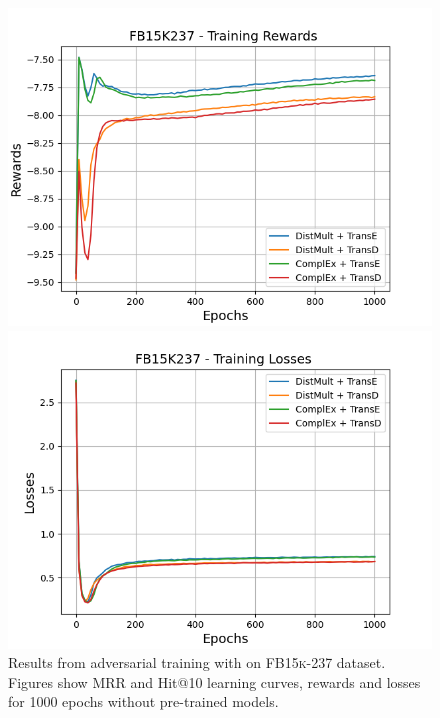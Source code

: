 \begin{figure}[H]
    \begin{minipage}{.45\textwidth}
      \centering
      \includegraphics[width=0.9\linewidth]{figures/results/gan_train/not_pretrained/random/fb15k237/epochs1000/random_fb15k237_rew.png}
    \end{minipage}%
     \begin{minipage}{.45\textwidth}
      \centering
      \includegraphics[width=0.9\linewidth]{figures/results/gan_train/not_pretrained/random/fb15k237/epochs1000/random_fb15k237_losses.png}
    \end{minipage}%
    \caption{Results from adversarial training with \origsampling on \textsc{FB15k-237} dataset.
    Figures show MRR and Hit@10 learning curves, rewards and losses for 1000 epochs without pre-trained models.}
    \label{fig:gan_train_not_pretrained_random_fb15k237}
\end{figure}
